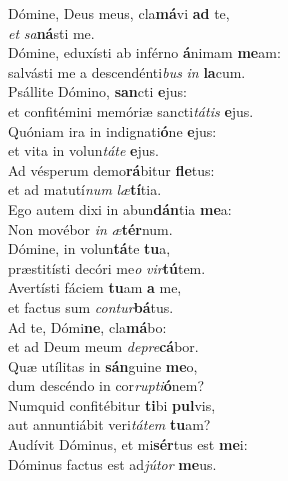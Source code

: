 \evenverse Dómine, Deus meus, cla\textbf{má}vi \textbf{ad} te,~\*\\
\evenverse \textit{et} \textit{sa}\textbf{ná}sti me.\\
\oddverse Dómine, eduxísti ab inférno \textbf{á}nimam \textbf{me}am:~\*\\
\oddverse salvásti me a descendénti\textit{bus} \textit{in} \textbf{la}cum.\\
\evenverse Psállite Dómino, \textbf{san}cti \textbf{e}jus:~\*\\
\evenverse et confitémini memóriæ sancti\textit{tá}\textit{tis} \textbf{e}jus.\\
\oddverse Quóniam ira in indignati\textbf{ó}ne \textbf{e}jus:~\*\\
\oddverse et vita in volun\textit{tá}\textit{te} \textbf{e}jus.\\
\evenverse Ad vésperum demo\textbf{rá}bitur \textbf{fle}tus:~\*\\
\evenverse et ad matutí\textit{num} \textit{læ}\textbf{tí}tia.\\
\oddverse Ego autem dixi in abun\textbf{dán}tia \textbf{me}a:~\*\\
\oddverse Non movébor \textit{in} \textit{æ}\textbf{tér}num.\\
\evenverse Dómine, in volun\textbf{tá}te \textbf{tu}a,~\*\\
\evenverse præstitísti decóri me\textit{o} \textit{vir}\textbf{tú}tem.\\
\oddverse Avertísti fáciem \textbf{tu}am \textbf{a} me,~\*\\
\oddverse et factus sum \textit{con}\textit{tur}\textbf{bá}tus.\\
\evenverse Ad te, Dómi\textbf{ne}, cla\textbf{má}bo:~\*\\
\evenverse et ad Deum meum \textit{de}\textit{pre}\textbf{cá}bor.\\
\oddverse Quæ utílitas in \textbf{sán}guine \textbf{me}o,~\*\\
\oddverse dum descéndo in cor\textit{rup}\textit{ti}\textbf{ó}nem?\\
\evenverse Numquid confitébitur \textbf{ti}bi \textbf{pul}vis,~\*\\
\evenverse aut annuntiábit veri\textit{tá}\textit{tem} \textbf{tu}am?\\
\oddverse Audívit Dóminus, et mi\textbf{sér}tus est \textbf{me}i:~\*\\
\oddverse Dóminus factus est ad\textit{jú}\textit{tor} \textbf{me}us.\\
